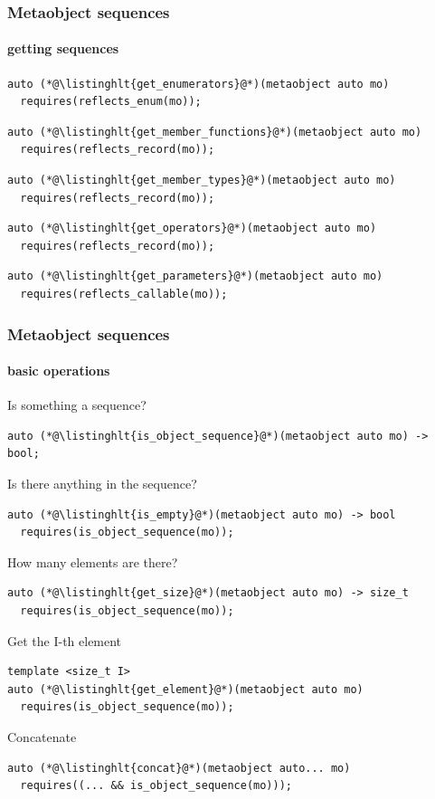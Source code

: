 \documentclass[aspectratio=169,compress,table,xcolor=table]{beamer}
\begin{document}
\begin{frame}[fragile]
  \frametitle{Metaobject sequences}
  \framesubtitle{getting sequences}
  \begin{lstlisting}[language=c++2x,basicstyle=\small\ttfamily]
auto (*@\listinghlt{get_enumerators}@*)(metaobject auto mo)
  requires(reflects_enum(mo));
  \end{lstlisting}
  \vfill
  \begin{lstlisting}[language=c++2x,basicstyle=\small\ttfamily]
auto (*@\listinghlt{get_member_functions}@*)(metaobject auto mo)
  requires(reflects_record(mo));
  \end{lstlisting}
  \vfill
  \begin{lstlisting}[language=c++2x,basicstyle=\small\ttfamily]
auto (*@\listinghlt{get_member_types}@*)(metaobject auto mo)
  requires(reflects_record(mo));
  \end{lstlisting}
  \vfill
  \begin{lstlisting}[language=c++2x,basicstyle=\small\ttfamily]
auto (*@\listinghlt{get_operators}@*)(metaobject auto mo)
  requires(reflects_record(mo));
  \end{lstlisting}
  \vfill
  \begin{lstlisting}[language=c++2x,basicstyle=\small\ttfamily]
auto (*@\listinghlt{get_parameters}@*)(metaobject auto mo)
  requires(reflects_callable(mo));
  \end{lstlisting}
\end{frame}
\begin{frame}[fragile]
  \frametitle{Metaobject sequences}
  \framesubtitle{basic operations}
  \smaller
  Is something a sequence?
  \begin{lstlisting}[language=c++2x,basicstyle=\small\ttfamily]
auto (*@\listinghlt{is_object_sequence}@*)(metaobject auto mo) -> bool;
  \end{lstlisting}
  \vfill
  Is there anything in the sequence?
  \begin{lstlisting}[language=c++2x,basicstyle=\footnotesize\ttfamily]
auto (*@\listinghlt{is_empty}@*)(metaobject auto mo) -> bool
  requires(is_object_sequence(mo));
  \end{lstlisting}
  \vfill
  How many elements are there?
  \begin{lstlisting}[language=c++2x,basicstyle=\footnotesize\ttfamily]
auto (*@\listinghlt{get_size}@*)(metaobject auto mo) -> size_t
  requires(is_object_sequence(mo));
  \end{lstlisting}
  \vfill
  Get the I-th element
  \begin{lstlisting}[language=c++2x,basicstyle=\footnotesize\ttfamily]
template <size_t I>
auto (*@\listinghlt{get_element}@*)(metaobject auto mo)
  requires(is_object_sequence(mo));
  \end{lstlisting}
  \vfill
  Concatenate
  \begin{lstlisting}[language=c++2x,basicstyle=\footnotesize\ttfamily]
auto (*@\listinghlt{concat}@*)(metaobject auto... mo)
  requires((... && is_object_sequence(mo)));
  \end{lstlisting}
\end{frame}
\end{document}
